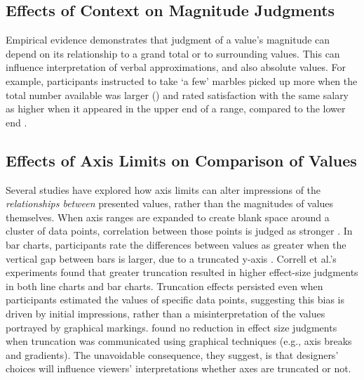 \documentclass[journal]{vgtc}                %
\begin{document}
\hypertarget{effects-of-context-on-magnitude-judgments}{%
\subsection{Effects of Context on Magnitude Judgments}\label{effects-of-context-on-magnitude-judgments}}

Empirical evidence demonstrates that judgment of a value's magnitude can
depend on its relationship to a grand total or to surrounding values.
This can influence interpretation of verbal approximations, and also
absolute values. For example, participants instructed to take `a few'
marbles picked up more when the total number available was larger
(\citep{borges_common_1974}) and rated satisfaction with the same salary as
higher when it appeared in the upper end of a range, compared to the
lower end \citep{brown_does_2008}.~

\hypertarget{effects-of-axis-limits-on-comparison-of-values}{%
\subsection{Effects of Axis Limits on Comparison of Values}\label{effects-of-axis-limits-on-comparison-of-values}}

Several studies have explored how axis limits can alter impressions of
the \emph{relationships between} presented values, rather than the magnitudes
of values themselves. When axis ranges are expanded to create blank
space around a cluster of data points, correlation between those points
is judged as stronger \citep{cleveland_variables_1982}. In bar charts,
participants rate the differences between values as greater when the
vertical gap between bars is larger, due to a truncated y-axis
\citep{pandey_how_2015}. Correll et al.'s \citep{correll_truncating_2020}
experiments found that greater truncation resulted in higher effect-size
judgments in both line charts and bar charts. Truncation effects
persisted even when participants estimated the values of specific data
points, suggesting this bias is driven by initial impressions, rather
than a misinterpretation of the values portrayed by graphical markings.
\citet{correll_truncating_2020} found no reduction in effect size judgments
when truncation was communicated using graphical techniques (e.g., axis
breaks and gradients). The unavoidable consequence, they suggest, is
that designers' choices will influence viewers' interpretations whether
axes are truncated or not.
\end{document}
